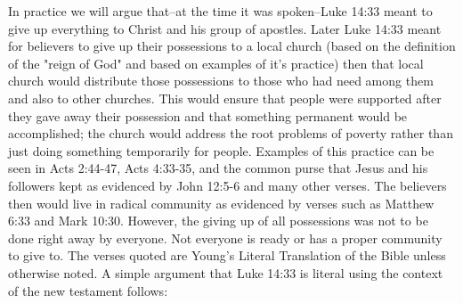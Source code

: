 \documentclass[11pt]{article}
\begin{document}
In practice we will argue that--at the time it was spoken--Luke 14:33 meant to give up everything to Christ and his group of apostles. Later Luke 14:33 meant for believers to give up their possessions to a local church (based on the definition of the "reign of God" and based on examples of it's practice) then that local church would distribute those possessions to those who had need among them and also to other churches. This would ensure that people were supported after they gave away their possession and that something permanent would be accomplished; the church would address the root problems of poverty rather than just doing something temporarily for people. Examples of this practice can be seen in Acts 2:44-47, Acts 4:33-35, and the common purse that Jesus and his followers kept as evidenced by John 12:5-6 and many other verses. The believers then would live in radical community as evidenced by verses such as Matthew 6:33 and Mark 10:30. However, the giving up of all possessions was not to be done right away by everyone. Not everyone is ready or has a proper community to give to. The verses quoted are Young's Literal Translation of the Bible unless otherwise noted. A simple argument that Luke 14:33 is literal using the context of the new testament follows:
\end{document}
